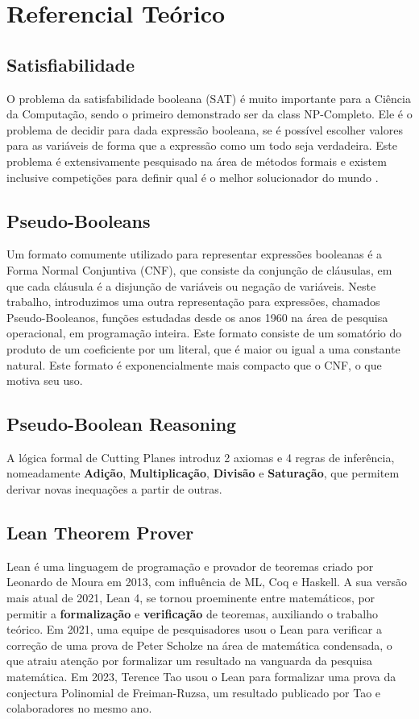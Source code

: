 \documentclass[conference]{IEEEtran}
\begin{document}
\section{Referencial Teórico}

\subsection{Satisfiabilidade}
O problema da satisfabilidade booleana (SAT) é muito importante para a Ciência da Computação, sendo o
primeiro demonstrado ser da class NP-Completo. Ele é o problema de decidir para dada expressão booleana,
se é possível escolher valores para as variáveis de forma que a expressão como um todo seja verdadeira.
Este problema é extensivamente pesquisado na área de métodos formais\cite{SatLive} e existem inclusive competições para
definir qual é o melhor solucionador do mundo \cite{SatComp}.

\subsection{Pseudo-Booleans}
Um formato comumente utilizado para representar expressões booleanas é a Forma Normal Conjuntiva (CNF), que
consiste da conjunção de cláusulas, em que cada cláusula é a disjunção de variáveis ou negação de variáveis\cite{CNF}.
Neste trabalho, introduzimos uma outra representação para expressões, chamados Pseudo-Booleanos, funções estudadas
desde os anos 1960 na área de pesquisa operacional, em programação inteira. Este formato consiste de um somatório
do produto de um coeficiente por um literal, que é maior ou igual a uma constante natural.
Este formato é exponencialmente mais compacto que o CNF, o que motiva seu uso\cite{PBSolve}.

\subsection{Pseudo-Boolean Reasoning}
A lógica formal de Cutting Planes introduz 2 axiomas e 4 regras de inferência, nomeadamente
\textbf{Adição}, \textbf{Multiplicação}, \textbf{Divisão} e \textbf{Saturação},
que permitem derivar novas inequações a partir de outras\cite{CutPlane}.

\subsection{Lean Theorem Prover}
Lean é uma linguagem de programação e provador de teoremas criado por Leonardo de Moura em 2013\cite{LeanProver}, com
influência de ML, Coq e Haskell.
A sua versão mais atual de 2021, Lean 4\cite{Lean4}, se tornou proeminente entre matemáticos, por permitir a
\textbf{formalização} e \textbf{verificação} de teoremas, auxiliando o trabalho teórico.
Em 2021, uma equipe de pesquisadores usou o Lean para verificar a correção de uma prova de Peter Scholze na área
de matemática condensada\cite{LTE}, o que atraiu atenção por formalizar um resultado na vanguarda da pesquisa matemática.
Em 2023, Terence Tao usou o Lean para formalizar uma prova da conjectura Polinomial de Freiman-Ruzsa\cite{PFR},
um resultado publicado por Tao e colaboradores no mesmo ano.
\end{document}
